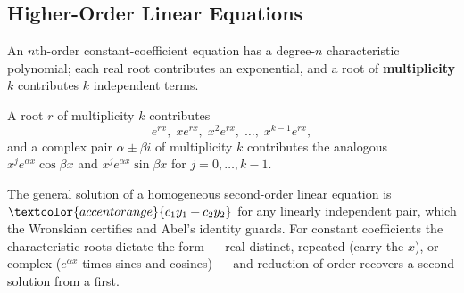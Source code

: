 \subsection{Higher-Order Linear Equations}

An $n$th-order constant-coefficient equation has a degree-$n$ characteristic
polynomial; each real root contributes an exponential, and a root of
\textbf{multiplicity} $k$ contributes $k$ independent terms.

\begin{formulabox}
A root $r$ of multiplicity $k$ contributes
\[ e^{r x},\; x e^{r x},\; x^2 e^{r x},\; \ldots,\; x^{k-1} e^{r x}, \]
and a complex pair $\alpha\pm\beta i$ of multiplicity $k$ contributes the analogous
$x^j e^{\alpha x}\cos\beta x$ and $x^j e^{\alpha x}\sin\beta x$ for $j=0,\ldots,k-1$.
\end{formulabox}

\begin{conceptbox}
The general solution of a homogeneous second-order linear equation is
$\textcolor{accentorange}{c_1 y_1 + c_2 y_2}$ for any
\textcolor{accentorange}{linearly independent} pair, which the
\textcolor{accentorange}{Wronskian} certifies and \textcolor{accentorange}{Abel's
identity} guards. For constant coefficients the
\textcolor{accentorange}{characteristic roots} dictate the form ---
\textcolor{accentorange}{real-distinct}, \textcolor{accentorange}{repeated}
(carry the $x$), or \textcolor{accentorange}{complex} ($e^{\alpha x}$ times sines
and cosines) --- and \textcolor{accentorange}{reduction of order} recovers a second
solution from a first.
\end{conceptbox}


